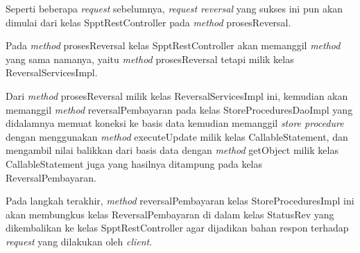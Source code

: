 Seperti beberapa \textit{request} sebelumnya, \textit{request reversal} yang sukses ini pun akan dimulai dari kelas SpptRestController pada \textit{method} prosesReversal.
  
Pada \textit{method} prosesReversal kelas SpptRestController akan memanggil \textit{method} yang sama namanya, yaitu \textit{method} prosesReversal tetapi milik kelas ReversalServicesImpl.
  
 Dari \textit{method} prosesReversal milik kelas ReversalServicesImpl ini, kemudian akan memanggil \textit{method} reversalPembayaran pada kelas StoreProceduresDaoImpl yang didalamnya memuat koneksi ke basis data kemudian memanggil \textit{store procedure} dengan menggunakan \textit{method} executeUpdate milik kelas CallableStatement, dan mengambil nilai balikkan dari basis data dengan \textit{method} getObject milik kelas CallableStatement juga yang hasilnya ditampung pada kelas ReversalPembayaran.
  
Pada langkah terakhir, \textit{method} reversalPembayaran kelas StoreProceduresImpl ini akan membungkus kelas ReversalPembayaran di dalam kelas StatusRev yang dikembalikan ke kelas SpptRestController agar dijadikan bahan respon terhadap \textit{request} yang dilakukan oleh \textit{client}.

